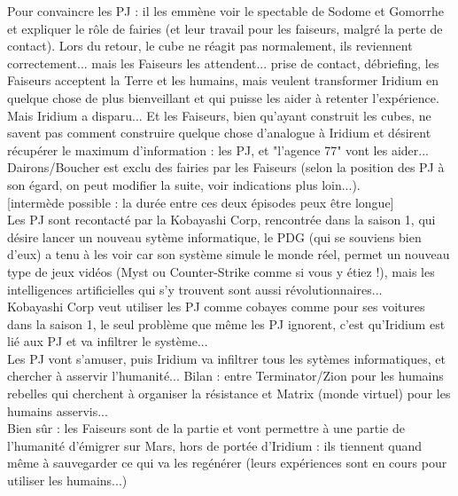 \documentclass[11pt,twoside,a4paper]{book}
\begin{document}
Pour convaincre les PJ : il les emm{\`e}ne voir le spectable de Sodome et Gomorrhe et expliquer le r{\^o}le de fairies (et leur travail pour les faiseurs, malgr{\'e} la perte de contact). Lors du retour, le cube ne r{\'e}agit pas normalement, ils reviennent correctement... mais les Faiseurs les attendent... prise de contact, d{\'e}briefing, les Faiseurs acceptent la Terre et les humains, mais veulent transformer Iridium en quelque chose de plus bienveillant et qui puisse les aider {\`a} retenter l'exp{\'e}rience. ~\\
Mais Iridium a disparu... Et les Faiseurs, bien qu'ayant construit les cubes, ne savent pas comment construire quelque chose d'analogue {\`a} Iridium et d{\'e}sirent r{\'e}cup{\'e}rer le maximum d'information : les PJ, et "l'agence 77" vont les aider... Dairons/Boucher est exclu des fairies par les Faiseurs (selon la position des PJ {\`a} son {\'e}gard, on peut modifier la suite, voir indications plus loin...). ~\\

[interm{\`e}de possible : la dur{\'e}e entre ces deux {\'e}pisodes peux {\^e}tre longue] ~\\

Les PJ sont recontact{\'e} par la Kobayashi Corp, rencontr{\'e}e dans la saison 1, qui d{\'e}sire lancer un nouveau syt{\`e}me informatique, le PDG (qui se souviens bien d'eux) a tenu {\`a} les voir car son syst{\`e}me simule le monde r{\'e}el, permet un nouveau type de jeux vid{\'e}os (Myst ou Counter-Strike comme si vous y {\'e}tiez !), mais les intelligences artificielles qui s'y trouvent sont aussi r{\'e}volutionnaires... ~\\
Kobayashi Corp veut utiliser les PJ comme cobayes comme pour ses voitures dans la saison 1, le seul probl{\`e}me que m{\^e}me les PJ ignorent, c'est qu'Iridium est li{\'e} aux PJ et va infiltrer le syst{\`e}me... ~\\
Les PJ vont s'amuser, puis Iridium va infiltrer tous les syt{\`e}mes informatiques, et chercher {\`a} asservir l'humanit{\'e}... Bilan : entre Terminator/Zion pour les humains rebelles qui cherchent {\`a} organiser la r{\'e}sistance et Matrix (monde virtuel) pour les humains asservis... ~\\
Bien s{\^u}r : les Faiseurs sont de la partie et vont permettre {\`a} une partie de l'humanit{\'e} d'{\'e}migrer sur Mars, hors de port{\'e}e d'Iridium : ils tiennent quand m{\^e}me {\`a} sauvegarder ce qui va les reg{\'e}n{\'e}rer (leurs exp{\'e}riences sont en cours pour utiliser les humains...) ~\\
\end{document}
